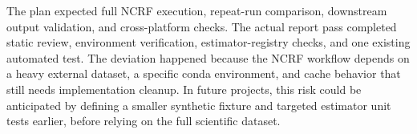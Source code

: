 \documentclass[12pt, titlepage]{article}
\begin{document}
\begin{enumerate}
  The plan expected full NCRF execution, repeat-run comparison, downstream output validation, and cross-platform checks. The actual report pass completed static review, environment verification, estimator-registry checks, and one existing automated test. The deviation happened because the NCRF workflow depends on a heavy external dataset, a specific conda environment, and cache behavior that still needs implementation cleanup. In future projects, this risk could be anticipated by defining a smaller synthetic fixture and targeted estimator unit tests earlier, before relying on the full scientific dataset.
\end{enumerate}
\end{document}
